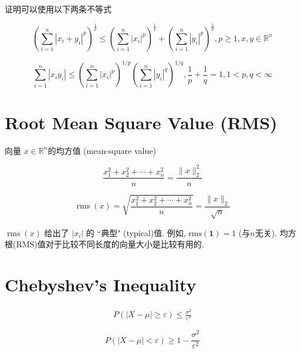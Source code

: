 证明可以使用以下两条不等式

\begin{theorem}
    $$ \left(\sum_{i=1}^{n}\left|x_{i}+y_{i}\right|^{p}\right)^{\frac{1}{p}} \leq\left(\sum_{i=1}^{n}\left|x_{i}\right|^{p}\right)^{\frac{1}{p}}+\left(\sum_{i=1}^{n}\left|y_{i}\right|^{p}\right)^{\frac{1}{p}}, p \geq 1, x, y \in \mathbb{R}^{n} $$
\end{theorem}

\begin{theorem}
    $$ \sum_{i=1}^{n}\left|x_{i} y_{i}\right| \leq\left(\sum_{i=1}^{n}\left|x_{i}\right|^{p}\right)^{1 / p}\left(\sum_{i=1}^{n}\left|y_{i}\right|^{q}\right)^{1 / q}, \frac{1}{p}+\frac{1}{q}=1,1<p, q<\infty $$
\end{theorem}

\section{Root Mean Square Value (RMS)}

\begin{definition}
    向量 $ x \in \mathbb{R}^n $的均方值 (mean-square value)

    $$ \frac{x_{1}^{2}+x_{2}^{2}+\cdots+x_{n}^{2}}{n}=\frac{\|x\|_{2}^{2}}{n} $$
\end{definition}

\begin{definition}
    $$ \operatorname{rms}(x)=\sqrt{\frac{x_{1}^{2}+x_{2}^{2}+\cdots+x_{n}^{2}}{n}}=\frac{\|x\|_{2}}{\sqrt{n}} $$
\end{definition}

$ \operatorname{rms}(x) $ 给出了 $ \left|x_{i}\right| $ 的 “典型" (typical)值. 例如, $ \mathrm{rms}(\mathbf{1})=1 $ (与$n$无关). 均方根(RMS)值对于比较不同长度的向量大小是比较有用的. 

\section{Chebyshev's Inequality}

\begin{theorem}
$$
\begin{aligned}
    P(|X-\mu| \ge \varepsilon) \le \frac{\sigma^2}{\varepsilon^2}
\end{aligned}
$$

$$
 P(|X-\mu| < \varepsilon) \ge 1 - \frac{\sigma^2}{\varepsilon^2}
$$
\end{theorem}

